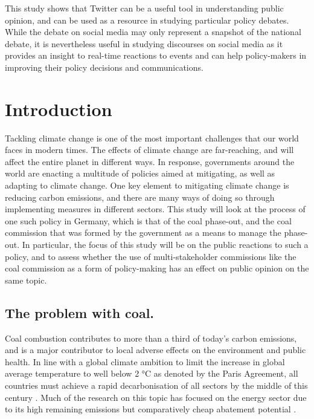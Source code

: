 \documentclass[12pt,onecolumn,twoside]{layout}
\begin{document}
This study shows that Twitter can be a useful tool in understanding public opinion, and can be used as a resource in studying particular policy debates. While the debate on social media may only represent a snapshot of the national debate, it is nevertheless useful in studying discourses on social media as it provides an insight to real-time reactions to events and can help policy-makers in improving their policy decisions and communications. 


\clearpage
\section{Introduction} \label{sec:introduction}
Tackling climate change is one of the most important challenges that our world faces in modern times. The effects of climate change are far-reaching, and will affect the entire planet in different ways. In response, governments around the world are enacting a multitude of policies aimed at mitigating, as well as adapting to climate change. One key element to mitigating climate change is reducing carbon emissions, and there are many ways of doing so through implementing measures in different sectors. This study will look at the process of one such policy in Germany, which is that of the coal phase-out, and the coal commission that was formed by the government as a means to manage the phase-out. In particular, the focus of this study will be on the public reactions to such a policy, and to assess whether the use of multi-stakeholder commissions like the coal commission as a form of policy-making has an effect on public opinion on the same topic.   

\subsection*{The problem with coal.}
Coal combustion contributes to more than a third of today's carbon emissions, and is a major contributor to local adverse effects on the environment and public health.  In line with a global climate ambition to limit the increase in global average temperature to well below 2 \si{\degree}C as denoted by the Paris Agreement, all countries must achieve a rapid decarbonisation of all sectors by the middle of this century \citep{Figueres2017}. Much of the research on this topic has focused on the energy sector due to its high remaining emissions but comparatively cheap abatement potential \citep{Armstrong2016}.
\end{document}

